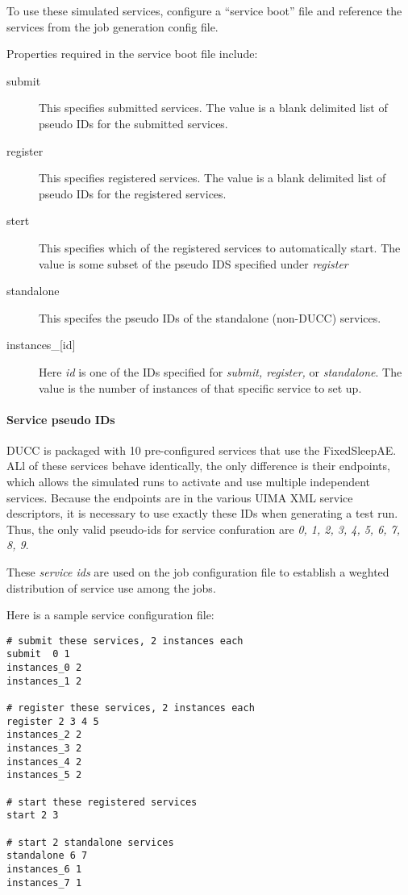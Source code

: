      To use these simulated services, configure a ``service boot'' file and reference
     the services from the job generation config file.

     Properties required in the service boot file include:
     \begin{description}
       \item[submit] This specifies submitted services.  The value is a blank delimited
         list of pseudo IDs for the submitted services.  
       \item[register] This specifies registered services.  The value is a blank delimited
         list of pseudo IDs for the registered services.
       \item[stert] This specifies which of the registered services to automatically 
         start.  The value is some subset of the pseudo IDS specified under {\em register}
       \item[standalone] This specifes the pseudo IDs of the standalone (non-DUCC) services.
       \item[instances\_{[id]}] Here {\em id} is one of the IDs specified for {\em submit,
           register,} or {\em standalone}.  The value is the number of instances of that
         specific service to set up.
     \end{description}
     
     \paragraph{Service pseudo IDs}
     DUCC is packaged with 10 pre-configured services that use the FixedSleepAE. ALl of these
     services behave identically, the only difference is their endpoints, which allows
     the simulated runs to activate and use multiple independent services.  Because the
     endpoints are in the various UIMA XML service descriptors, it is necessary to use
     exactly these IDs when generating a test run.  Thus, the only valid pseudo-ids
     for service confuration are {\em 0, 1, 2, 3, 4, 5, 6, 7, 8, 9}.

     These {\em service ids} are used on the job configuration file to establish a
     weghted distribution of service use among the jobs.

     Here is a sample service configuration file:
\begin{verbatim}
# submit these services, 2 instances each
submit  0 1
instances_0 2
instances_1 2

# register these services, 2 instances each
register 2 3 4 5
instances_2 2
instances_3 2
instances_4 2
instances_5 2

# start these registered services
start 2 3 

# start 2 standalone services
standalone 6 7 
instances_6 1
instances_7 1
\end{verbatim}

